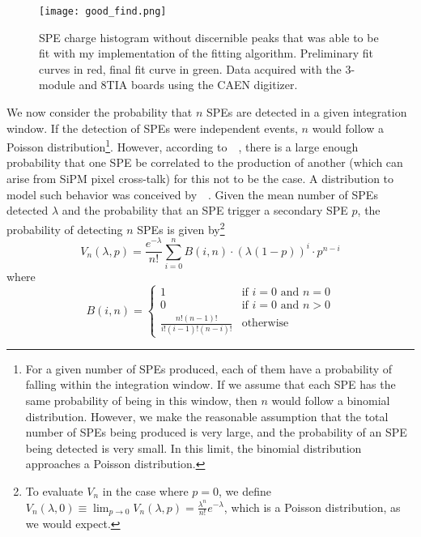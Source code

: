 \documentclass[12pt,openright,twoside]{report}
\begin{document}
\begin{figure}[h]
    \centering
    \texttt{[image: good\_find.png]}
    \caption{SPE charge histogram without discernible peaks that was able to be fit with my implementation of the fitting algorithm. Preliminary fit curves in red,
    final fit curve in green. Data acquired with the 3-module and 8TIA boards using the CAEN digitizer.}
    \label{fig:good_find}
\end{figure}

We now consider the probability that $n$ SPEs are detected in a given
integration window. If the detection of SPEs were independent events, $n$ would
follow a Poisson distribution\footnote{For a given number of SPEs produced,
each of them have a probability of falling within the integration window. If we
assume that each SPE has the same probability of being in this window, then $n$
would follow a binomial distribution. However, we make the reasonable
assumption that the total number of SPEs being produced is very large, and the
probability of an SPE being detected is very small. In this limit, the binomial
distribution approaches a Poisson distribution.}. However, according
to~\citeauthor{Agnes_2021}~\cite{Agnes_2021}, there is a large enough
probability that one SPE be correlated to the production of another (which can
arise from SiPM pixel cross-talk) for this not to be the case. A distribution
to model such behavior was conceived
by~\citeauthor{Vinogradov}~\cite{Vinogradov}. Given the mean number of SPEs
detected $\lambda$ and the probability that an SPE trigger a secondary SPE $p$,
the probability of detecting $n$ SPEs is given by\footnote{To evaluate $V_n$ in
the case where $p=0$, we define $V_n(\lambda, 0) \equiv \lim_{p \to 0}
V_n(\lambda, p) = \frac{\lambda^n}{n!}e^{-\lambda}$, which is a Poisson
distribution, as we would expect.}
\begin{equation}
    V_n(\lambda, p) = \frac{e^{-\lambda}}{n!} \sum_{i=0}^n B(i, n) \cdot (\lambda(1-p))^i \cdot p^{n-i}
\end{equation}
where
\begin{equation}
    B(i, n) = 
    \begin{cases}
        1 & \text{if } i=0 \text{ and } n=0\\
        0 & \text{if } i=0 \text{ and } n>0\\
        \frac{n!(n-1)!}{i!(i-1)!(n-i)!} & \text{otherwise}
    \end{cases}
\end{equation}
\end{document}
